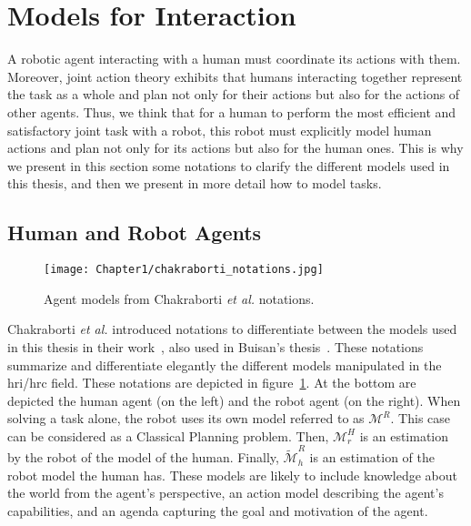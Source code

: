 \section{Models for Interaction}


A robotic agent interacting with a human must coordinate its actions with them. Moreover, joint action theory exhibits that humans interacting together represent the task as a whole and plan not only for their actions but also for the actions of other agents. Thus, we think that for a human to perform the most efficient and satisfactory joint task with a robot, this robot must explicitly model human actions and plan not only for its actions but also for the human ones. This is why we present in this section some notations to clarify the different models used in this thesis, and then we present in more detail how to model tasks.

\subsection{Human and Robot Agents}

\begin{figure}[h]
    \centering
    \texttt{[image: Chapter1/chakraborti\_notations.jpg]}
    \caption{Agent models from Chakraborti \textit{et al.} notations.}
    \label{fig:chakraborti_notations}
\end{figure}

Chakraborti \textit{et al.} introduced notations to differentiate between the models used in this thesis in their work~\cite{ChakrabortiBTZS15}, also used in Buisan's thesis~\cite{thesisBuisan21}. These notations summarize and differentiate elegantly the different models manipulated in the \acrshort{hri}/\acrshort{hrc} field. These notations are depicted in figure~\ref{fig:chakraborti_notations}. At the bottom are depicted the human agent (on the left) and the robot agent (on the right). When solving a task alone, the robot uses its own model referred to as $\mathcal{M}^R$. This case can be considered as a Classical Planning problem. 
Then, $\mathcal{M}^H_r$ is an estimation by the robot of the model of the human. Finally, $\tilde{\mathcal{M}}^R_h$ is an estimation of the robot model the human has. These models are likely to include knowledge about the world from the agent's perspective, an action model describing the agent's capabilities, and an agenda capturing the goal and motivation of the agent.

